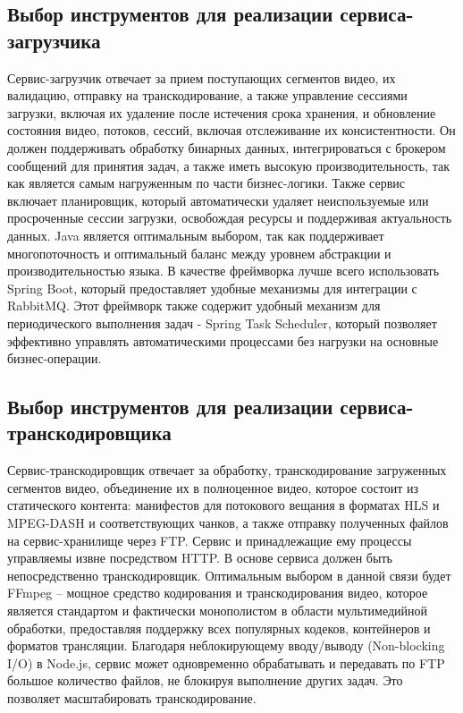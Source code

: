 	\subsection{Выбор инструментов для реализации сервиса-загрузчика}

	Сервис-загрузчик отвечает за прием поступающих сегментов видео, их валидацию, отправку на транскодирование, а также управление сессиями загрузки, включая их удаление после истечения срока хранения, и обновление состояния видео, потоков, сессий, включая отслеживание их консистентности. Он должен поддерживать обработку бинарных данных, интегрироваться с брокером сообщений для принятия задач, а также иметь высокую производительность, так как является самым нагруженным по части бизнес-логики. Также сервис включает планировщик, который автоматически удаляет неиспользуемые или просроченные сессии загрузки, освобождая ресурсы и поддерживая актуальность данных. Java является оптимальным выбором, так как поддерживает многопоточность и оптимальный баланс между уровнем абстракции и производительностью языка. В качестве фреймворка лучше всего использовать Spring Boot, который предоставляет удобные механизмы для интеграции с RabbitMQ. Этот фреймворк также содержит удобный механизм для периодического выполнения задач - Spring Task Scheduler, который позволяет эффективно управлять автоматическими процессами без нагрузки на основные бизнес-операции.
	
	\subsection{Выбор инструментов для реализации сервиса-транскодировщика}
	
	Сервис-транскодировщик отвечает за обработку, транскодирование загруженных сегментов видео, объединение их в полноценное видео, которое состоит из статического контента: манифестов для потокового вещания в форматах HLS и MPEG-DASH и соответствующих чанков, а также отправку полученных файлов на сервис-хранилище через FTP. Сервис и принадлежащие ему процессы управляемы извне посредством HTTP. В основе сервиса должен быть непосредственно транскодировщик. Оптимальным выбором в данной связи будет FFmpeg – мощное средство кодирования и транскодирования видео, которое является стандартом и фактически монополистом в области мультимедийной обработки, предоставляя поддержку всех популярных кодеков, контейнеров и форматов трансляции. Благодаря неблокирующему вводу/выводу (Non-blocking I/O) в Node.js, сервис может одновременно обрабатывать и передавать по FTP большое количество файлов, не блокируя выполнение других задач. Это позволяет масштабировать транскодирование.

